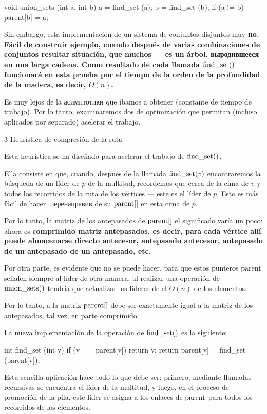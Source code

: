 void union_sets (int a, int b) {
a = find_set (a);
b = find_set (b);
if (a != b)
parent[b] = a;
}
\endcode

Sin embargo, esta implementación de un sistema de conjuntos disjuntos muy \bf{no}. Fácil de construir ejemplo, cuando después de varias combinaciones de conjuntos resultar situación, que muchos --- es un árbol, выродившееся en una larga cadena. Como resultado de cada llamada ${\rm find\_set}()$ funcionará en esta prueba por el tiempo de la orden de la profundidad de la madera, es decir, $O(n)$.

Es muy lejos de la асимптотики que íbamos a obtener (constante de tiempo de trabajo). Por lo tanto, examinaremos dos de optimización que permitan (incluso aplicados por separado) acelerar el trabajo.



\h3{ Heurística de compresión de la ruta }

Esta heurística se ha diseñado para acelerar el trabajo de ${\rm find\_set}()$.

Ella consiste en que, cuando, después de la llamada ${\rm find\_set}(v)$ encontraremos la búsqueda de un líder de $p$ de la multitud, recordemos que cerca de la cima de $v$ y todos los recorridos de la ruta de los vértices --- este es el líder de $p$. Esto es más fácil de hacer, перенаправив de su ${\rm parent}[]$ en esta cima de $p$.

Por lo tanto, la matriz de los antepasados de ${\rm parent}[]$ el significado varía un poco: ahora es \bf{comprimido matriz antepasados}, es decir, para cada vértice allí puede almacenarse directo antecesor, antepasado antecesor, antepasado de un antepasado de un antepasado, etc.

Por otra parte, es evidente que no se puede hacer, para que estos punteros ${\rm parent}$ señalen siempre al líder de otra manera, al realizar una operación de ${\rm union\_sets}()$ tendría que actualizar los líderes de el $O(n)$ de los elementos.

Por lo tanto, a la matriz ${\rm parent}[]$ debe ser exactamente igual a la matriz de los antepasados, tal vez, en parte comprimido.

La nueva implementación de la operación de ${\rm find\_set}()$ es la siguiente:

\code
int find_set (int v) {
if (v == parent[v])
return v;
return parent[v] = find_set (parent[v]);
}
\endcode

Esta sencilla aplicación hace todo lo que debe ser: primero, mediante llamadas recursivas se encuentra el líder de la multitud, y luego, en el proceso de promoción de la pila, este líder se asigna a los enlaces de ${\rm parent}$ para todos los recorridos de los elementos.

